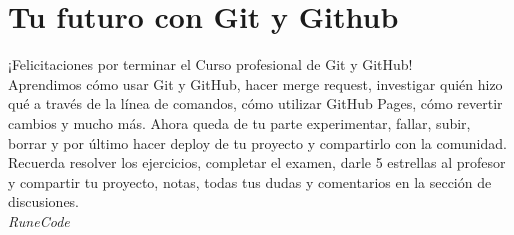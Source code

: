 \documentclass{article}
\begin{document}
\section{Tu futuro con Git y Github}%
¡Felicitaciones por terminar el Curso profesional de Git y GitHub!\\

Aprendimos cómo usar Git y GitHub, hacer merge request, investigar quién hizo
qué a través de la línea de comandos, cómo utilizar GitHub Pages, cómo revertir
cambios y mucho más. Ahora queda de tu parte experimentar, fallar, subir,
borrar y por último hacer deploy de tu proyecto y compartirlo con la
comunidad.\\

Recuerda resolver los ejercicios, completar el examen, darle 5 estrellas al
profesor y compartir tu proyecto, notas, todas tus dudas y comentarios en la
sección de discusiones.\\
































\vspace{2cm}
\LARGE\textit{RuneCode}
\end{document}
